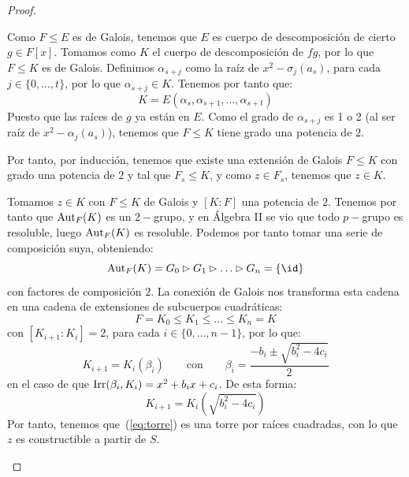 \begin{teo}
\begin{proof}
\begin{description}
\begin{itemize}
                        Como $F\leq E$ es de Galois, tenemos que $E$ es cuerpo de descomposición de cierto $g\in F[x]$. Tomamos como $K$ el cuerpo de descomposición de $fg$, por lo que $F\leq K$ es de Galois. Definimos $\alpha_{s+j}$ como la raíz de $x^2-\sigma_j(a_s)$, para cada $j \in \{0, \ldots, t\}$, por lo que $\alpha_{s+j}\in K$. Tenemos por tanto que:
                        \begin{equation*}
                            K = E(\alpha_s, \alpha_{s+1}, \ldots,\alpha_{s+t})
                        \end{equation*}
                        Puesto que las raíces de $g$ ya están en $E$. Como el grado de $\alpha_{s+j}$ es 1 o 2 (al ser raíz de $x^2-\alpha_j(a_s)$), tenemos que $F\leq K$ tiene grado una potencia de 2.
                \end{itemize}

                Por tanto, por inducción, tenemos que existe una extensión de Galois $F\leq K$ con grado una potencia de $2$ y tal que $F_s\leq K$, y como $z\in F_s$, tenemos que $z\in K$.
            \item [$\Longleftarrow )$] Tomamos $z\in K$ con $F\leq K$ de Galois y $[K:F]$ una potencia de $2$. Tenemos por tanto que $\operatorname{Aut}_F(K)$ es un $2-$grupo, y en Álgebra II se vio que todo $p-$grupo es resoluble, luego $\operatorname{Aut}_F(K)$ es resoluble. Podemos por tanto tomar una serie de composición suya, obteniendo:
                \begin{equation*}
                    \Aut_F(K) = G_0 \rhd G_1 \rhd \ldots \rhd G_n = \{\id\}
                \end{equation*}
                con factores de composición $2$. La conexión de Galois nos transforma esta cadena en una cadena de extensiones de subcuerpos cuadráticas:
                \begin{equation}\label{eq:torre}
                    F=K_0 \leq K_1 \leq \ldots \leq K_n = K
                \end{equation}
                con $[K_{i+1}:K_i] = 2$, para cada $i \in \{0, \ldots, n-1\}$, por lo que:
                \begin{equation*}
                    K_{i+1} = K_i(\beta_i)\qquad \text{con}\qquad \beta_i = \frac{-b_i\pm \sqrt{b_i^2 - 4c_i}}{2}
                \end{equation*}
                en el caso de que $\operatorname{Irr}(\beta_i,K_i) = x^2+b_ix+c_i$. De esta forma:
                \begin{equation*}
                    K_{i+1} = K_i\left(\sqrt{b_i^2 - 4c_i}\right)
                \end{equation*}
                Por tanto, tenemos que~(\ref{eq:torre}) es una torre por raíces cuadradas, con lo que $z$ es constructible a partir de $S$.
        \end{description}
    \end{proof}
\end{teo}

